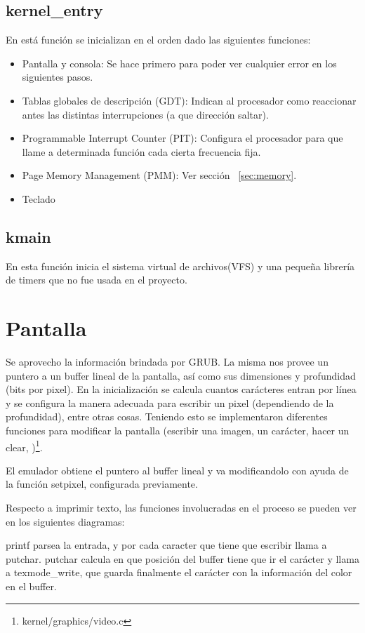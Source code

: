 \subsection[kernel\_entry]{kernel\_entry\protect\footnotemark{}\protect{}}
En está función se inicializan en el orden dado las siguientes funciones:
\begin{itemize}
\item Pantalla y consola: Se hace primero para poder ver cualquier error en los siguientes pasos.
\item Tablas globales de descripción (GDT): Indican al procesador como reaccionar antes las distintas interrupciones (a que dirección saltar).
\item Programmable Interrupt Counter (PIT): Configura el procesador para que llame a determinada función cada cierta frecuencia fija.
\item Page Memory Management (PMM): Ver sección ~\ref{sec:memory}.
\item Teclado
\end{itemize}

\subsection[kmain]{kmain\protect\footnotemark{}\protect{}}
En esta función inicia el sistema virtual de archivos(VFS) y una pequeña librería de timers que no fue usada en el proyecto.


\section{Pantalla}\label{sec:pantalla}
Se aprovecho la información brindada por GRUB. La misma nos provee un puntero a un buffer lineal de la pantalla, así como sus dimensiones y profundidad (bits por pixel). En la inicialización se calcula cuantos carácteres entran por línea y se configura la manera adecuada para  escribir un pixel (dependiendo de la profundidad), entre otras cosas.
Teniendo esto se implementaron diferentes funciones para modificar la  pantalla (escribir una imagen, un carácter, hacer un clear, \etc)\footnote{kernel/graphics/video.c}.

El emulador obtiene el puntero al buffer lineal y va modificandolo con ayuda de la función setpixel, configurada previamente.

Respecto a imprimir texto, las funciones involucradas en el proceso se pueden ver en los siguientes diagramas:
printf parsea la entrada, y por cada caracter que tiene que escribir llama a putchar. putchar calcula en que posición del buffer tiene que ir el carácter y llama a texmode\_write, que guarda finalmente el carácter con la información del color en el buffer.

